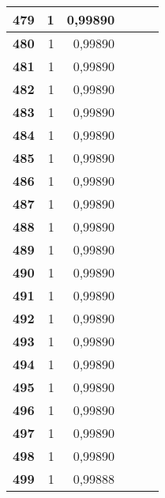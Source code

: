\begin{longtable}{|r|r|r|l|r|r|}
\textbf{479} & 1 & 0,99890 &  & \multicolumn{1}{l|}{} & \multicolumn{1}{l|}{} \\ \hline
\textbf{480} & 1 & 0,99890 &  & \multicolumn{1}{l|}{} & \multicolumn{1}{l|}{} \\ \hline
\textbf{481} & 1 & 0,99890 &  & \multicolumn{1}{l|}{} & \multicolumn{1}{l|}{} \\ \hline
\textbf{482} & 1 & 0,99890 &  & \multicolumn{1}{l|}{} & \multicolumn{1}{l|}{} \\ \hline
\textbf{483} & 1 & 0,99890 &  & \multicolumn{1}{l|}{} & \multicolumn{1}{l|}{} \\ \hline
\textbf{484} & 1 & 0,99890 &  & \multicolumn{1}{l|}{} & \multicolumn{1}{l|}{} \\ \hline
\textbf{485} & 1 & 0,99890 &  & \multicolumn{1}{l|}{} & \multicolumn{1}{l|}{} \\ \hline
\textbf{486} & 1 & 0,99890 &  & \multicolumn{1}{l|}{} & \multicolumn{1}{l|}{} \\ \hline
\textbf{487} & 1 & 0,99890 &  & \multicolumn{1}{l|}{} & \multicolumn{1}{l|}{} \\ \hline
\textbf{488} & 1 & 0,99890 &  & \multicolumn{1}{l|}{} & \multicolumn{1}{l|}{} \\ \hline
\textbf{489} & 1 & 0,99890 &  & \multicolumn{1}{l|}{} & \multicolumn{1}{l|}{} \\ \hline
\textbf{490} & 1 & 0,99890 &  & \multicolumn{1}{l|}{} & \multicolumn{1}{l|}{} \\ \hline
\textbf{491} & 1 & 0,99890 &  & \multicolumn{1}{l|}{} & \multicolumn{1}{l|}{} \\ \hline
\textbf{492} & 1 & 0,99890 &  & \multicolumn{1}{l|}{} & \multicolumn{1}{l|}{} \\ \hline
\textbf{493} & 1 & 0,99890 &  & \multicolumn{1}{l|}{} & \multicolumn{1}{l|}{} \\ \hline
\textbf{494} & 1 & 0,99890 &  & \multicolumn{1}{l|}{} & \multicolumn{1}{l|}{} \\ \hline
\textbf{495} & 1 & 0,99890 &  & \multicolumn{1}{l|}{} & \multicolumn{1}{l|}{} \\ \hline
\textbf{496} & 1 & 0,99890 &  & \multicolumn{1}{l|}{} & \multicolumn{1}{l|}{} \\ \hline
\textbf{497} & 1 & 0,99890 &  & \multicolumn{1}{l|}{} & \multicolumn{1}{l|}{} \\ \hline
\textbf{498} & 1 & 0,99890 &  & \multicolumn{1}{l|}{} & \multicolumn{1}{l|}{} \\ \hline
\textbf{499} & 1 & 0,99888 &  & \multicolumn{1}{l|}{} & \multicolumn{1}{l|}{} \\ \hline

\end{longtable}
